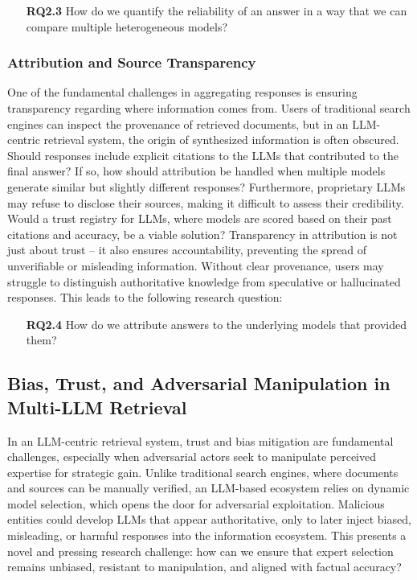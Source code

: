 \begin{itemize}
    \item[\textbf{RQ2.3}] How do we quantify the reliability of an answer in a way that we can compare multiple heterogeneous models?
\end{itemize}

\subsubsection{Attribution and Source Transparency}
One of the fundamental challenges in aggregating responses is ensuring transparency regarding where information comes from. Users of traditional search engines can inspect the provenance of retrieved documents, but in an LLM-centric retrieval system, the origin of synthesized information is often obscured. Should responses include explicit citations to the LLMs that contributed to the final answer? If so, how should attribution be handled when multiple models generate similar but slightly different responses? Furthermore, proprietary LLMs may refuse to disclose their sources, making it difficult to assess their credibility. Would a trust registry for LLMs, where models are scored based on their past citations and accuracy, be a viable solution? Transparency in attribution is not just about trust -- it also ensures accountability, preventing the spread of unverifiable or misleading information. Without clear provenance, users may struggle to distinguish authoritative knowledge from speculative or hallucinated responses. This leads to the following research question:

\begin{itemize}
    \item[\textbf{RQ2.4}] How do we attribute answers to the underlying models that provided them?
\end{itemize}

\subsection{Bias, Trust, and Adversarial Manipulation in Multi-LLM Retrieval}
In an LLM-centric retrieval system, trust and bias mitigation are fundamental challenges, especially when adversarial actors seek to manipulate perceived expertise for strategic gain. Unlike traditional search engines, where documents and sources can be manually verified, an LLM-based ecosystem relies on dynamic model selection, which opens the door for adversarial exploitation. Malicious entities could develop LLMs that appear authoritative, only to later inject biased, misleading, or harmful responses into the information ecosystem. This presents a novel and pressing research challenge: how can we ensure that expert selection remains unbiased, resistant to manipulation, and aligned with factual accuracy?

